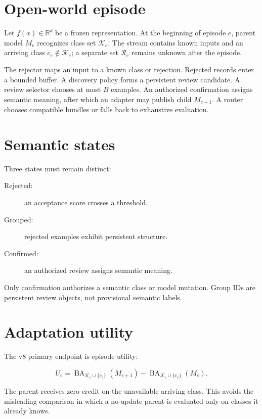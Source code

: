 \documentclass[12pt,oneside]{report}
\newcommand{\ba}{\operatorname{BA}}
\newcommand{\utility}{U}
\begin{document}
\section{Open-world episode}

Let $f(x)\in\mathbb{R}^d$ be a frozen representation. At the beginning of
episode $e$, parent model $M_e$ recognizes class set $\mathcal{K}_e$. The
stream contains known inputs and an arriving class $c_e\notin\mathcal{K}_e$;
a separate set $\mathcal{R}_e$ remains unknown after the episode.

The rejector maps an input to a known class or rejection. Rejected records enter
a bounded buffer. A discovery policy forms a persistent review candidate.
A review selector chooses at most $B$ examples. An authorized confirmation
assigns semantic meaning, after which an adapter may publish child
$M_{e+1}$. A router chooses compatible bundles or falls back to exhaustive
evaluation.

\section{Semantic states}

Three states must remain distinct:

\begin{description}
\item[Rejected:] an acceptance score crosses a threshold.
\item[Grouped:] rejected examples exhibit persistent structure.
\item[Confirmed:] an authorized review assigns semantic meaning.
\end{description}

Only confirmation authorizes a semantic class or model mutation. Group IDs are
persistent review objects, not provisional semantic labels.

\section{Adaptation utility}

The v8 primary endpoint is episode utility:

\begin{equation}
\utility_e =
\ba_{\mathcal{K}_e\cup\{c_e\}}(M_{e+1})
-
\ba_{\mathcal{K}_e\cup\{c_e\}}(M_e).
\label{eq:utility}
\end{equation}

The parent receives zero credit on the unavailable arriving class. This avoids
the misleading comparison in which a no-update parent is evaluated only on
classes it already knows.
\end{document}
